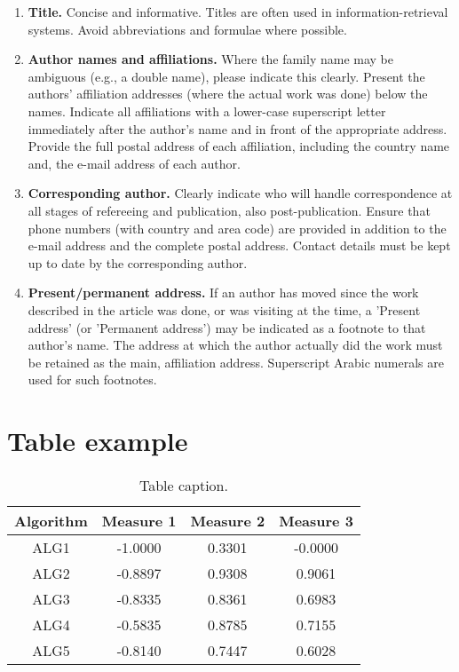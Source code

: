 \documentclass[review]{elsarticle}
\begin{document}
\begin{enumerate}
    \item \textbf{Title.} Concise and informative. Titles are often used in information-retrieval systems. Avoid abbreviations and formulae where possible.
    \item \textbf{Author names and affiliations.} Where the family name may be ambiguous (e.g., a double name), please indicate this clearly. Present the authors' affiliation addresses (where the actual work was done) below the names. Indicate all affiliations with a lower-case superscript letter immediately after the author's name and in front of the appropriate address. Provide the full postal address of each affiliation, including the country name and, the e-mail address of each author.
    \item \textbf{Corresponding author.} Clearly indicate who will handle correspondence at all stages of refereeing and publication, also post-publication. Ensure that phone numbers (with country and area code) are provided in addition to the e-mail address and the complete postal address. Contact details must be kept up to date by the corresponding author.
    \item \textbf{Present/permanent address.} If an author has moved since the work described in the article was done, or was visiting at the time, a 'Present address' (or 'Permanent address') may be indicated as a footnote to that author's name. The address at which the author actually did the work must be retained as the main, affiliation address. Superscript Arabic numerals are used for such footnotes.
\end{enumerate}

\section{Table example}

\begin{table}[H]
\caption{Table caption.}
\centering
\begin{tabular}{|c|ccc|}
\hline
Algorithm & Measure 1 & Measure 2 & Measure 3 \\ \hline
ALG1 &-1.0000&0.3301&-0.0000 \\ \hline
ALG2 & -0.8897 &0.9308&0.9061 \\ \hline
ALG3 & -0.8335&0.8361&0.6983 \\ \hline
ALG4 & -0.5835&0.8785&0.7155 \\ \hline
ALG5 & -0.8140&0.7447&0.6028 \\ \hline
\end{tabular}

\end{table}
\end{document}
